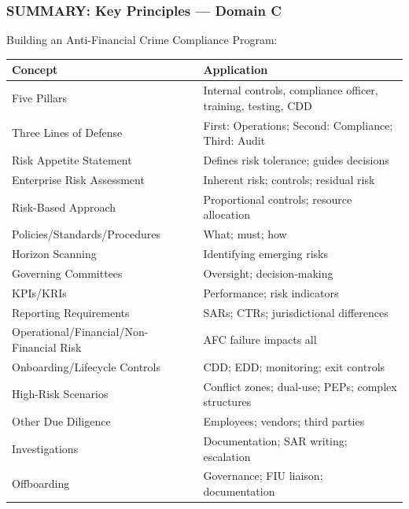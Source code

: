 \documentclass[12pt,aspectratio=169]{beamer}
\renewcommand{\scriptsize}{\fontsize{5}{6}\selectfont}
\newcommand{\keypoint}[1]{\textcolor{deepblue}{\textbf{#1}}}
\begin{document}
	\begin{frame}
		\frametitle{\fontsize{11}{13}\selectfont SUMMARY: Key Principles — Domain C}
		\scriptsize
		\begin{block}{\fontsize{9}{11}\selectfont Building an Anti-Financial Crime Compliance Program:}
			\vspace{0.05cm}
			\scriptsize
			\begin{tabular}{|p{}|p{}|}
				\hline
				\keypoint{Concept} & \keypoint{Application} \\
				\hline
				Five Pillars & Internal controls, compliance officer, training, testing, CDD \\
				\hline
				Three Lines of Defense & First: Operations; Second: Compliance; Third: Audit \\
				\hline
				Risk Appetite Statement & Defines risk tolerance; guides decisions \\
				\hline
				Enterprise Risk Assessment & Inherent risk; controls; residual risk \\
				\hline
				Risk-Based Approach & Proportional controls; resource allocation \\
				\hline
				Policies/Standards/Procedures & What; must; how \\
				\hline
				Horizon Scanning & Identifying emerging risks \\
				\hline
				Governing Committees & Oversight; decision-making \\
				\hline
				KPIs/KRIs & Performance; risk indicators \\
				\hline
				Reporting Requirements & SARs; CTRs; jurisdictional differences \\
				\hline
				Operational/Financial/Non-Financial Risk & AFC failure impacts all \\
				\hline
				Onboarding/Lifecycle Controls & CDD; EDD; monitoring; exit controls \\
				\hline
				High-Risk Scenarios & Conflict zones; dual-use; PEPs; complex structures \\
				\hline
				Other Due Diligence & Employees; vendors; third parties \\
				\hline
				Investigations & Documentation; SAR writing; escalation \\
				\hline
				Offboarding & Governance; FIU liaison; documentation \\

\end{tabular}
\end{block}
\end{frame}
\end{document}
